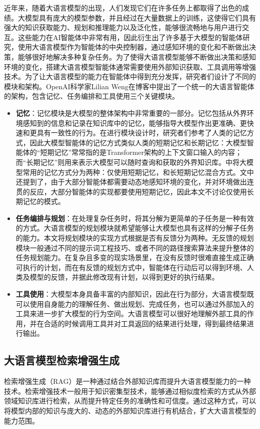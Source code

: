 近年来，随着大语言模型的出现，人们发现它们在许多任务上都取得了出色的成绩。大模型具有庞大的模型参数，并且经过在大量数据上的训练，这使得它们具有强大的知识获取能力、规划和推理能力以及泛化性，能够很流畅地与用户进行交互\cite{Wang2023c}。这些能力在AI智能体中非常有用，因此衍生出了许多基于大模型的智能体研究，使用大语言模型作为智能体的中央控制器，通过感知环境的变化和不断做出决策，能够很好地解决多种复杂任务。为了使得大语言模型能够不断做出决策和感知环境的变化，搭建大语言模型智能体通常需要使用外部知识获取、工具调用等增强技术。为了让大语言模型的能力在智能体中得到充分发挥，研究者们设计了不同的模块和架构。OpenAI科学家Lilian Weng在博客\cite{Weng2023}中提出了一个统一的大语言智能体的架构，包含记忆、任务编排和工具使用三个关键模块。

\begin{itemize}
    \item \textbf{记忆}：记忆模块是大模型的整体架构中非常重要的一部分。记忆包括从外界环境感知到的信息和记录在知识库中的记忆，能够指导大模型作出更准确、更快速和更具有一致性的行为。在进行模块设计时，研究者们参考了人类的记忆方式，因此大模型智能体的记忆方式类似人类的短期记忆和长期记忆：大模型智能体的“短期记忆”常常指的是Transformer\cite{Ge2024}架构的上下文窗口输入的内容；而“长期记忆”则用来表示大模型可以随时查询和获取的外界知识库。\cite{Wang2023}中将大模型常用的记忆方式分为两种：仅使用短期记忆，和长短期记忆混合方式。文中还提到了，由于大部分智能体都需要动态地感知环境的变化，并对环境做出连贯的反应，大部分智能体的实现都要使用短期记忆，因此本文不讨论仅使用长期记忆的模式。
    \item \textbf{任务编排与规划}：在处理复杂任务时，将其分解为更简单的子任务是一种有效的方式。大语言模型的规划模块就希望能够让大模型也具有这样的分解子任务的能力。本文将规划模块的实现方式根据是否有反馈分为两种。无反馈的规划模块一般通过不同的提示词工程技巧、或者不同的路径搜索算法来提升整体的任务规划能力。在复杂且多变的现实场景里，在没有反馈时很难直接生成正确可执行的计划，而在有反馈的规划方式中，智能体在行动后可以得到环境、人类及模型的反馈，并据此修改现有计划，以得到更好的执行结果。 
    \item \textbf{工具使用}：大模型本身具备丰富的内部知识，因此在行为部分，大语言模型既可以使用自身能力的理解任务、做出规划、完成任务，也可以通过外部加入的工具来进一步扩大模型的行为空间。大语言模型可以很好地理解外部工具的作用，并在合适的时候调用工具并对工具返回的结果进行处理，得到最终结果进行输出。
  \end{itemize}

\subsection{大语言模型检索增强生成}
检索增强生成（RAG）是一种通过结合外部知识库而提升大语言模型能力的一种技术。检索增强技术一般用于知识密集型技术，能够通过相似度检索的方式从外部领域知识库进行检索，从而提升特定任务的准确性和可信度。通过这种方式，可以将模型内部的知识与庞大的、动态的外部知识库进行有机结合，扩大大语言模型的能力范围。

